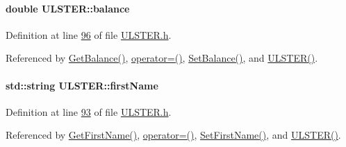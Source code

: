 \paragraph[{\texorpdfstring{balance}{balance}}]{\setlength{\rightskip}{0pt plus 5cm}double U\+L\+S\+T\+E\+R\+::balance\hspace{0.3cm}{\ttfamily [private]}}\hypertarget{class_u_l_s_t_e_r_af98d3ed41f452b28f26994552465815c_af98d3ed41f452b28f26994552465815c}{}\label{class_u_l_s_t_e_r_af98d3ed41f452b28f26994552465815c_af98d3ed41f452b28f26994552465815c}


Definition at line \hyperlink{_u_l_s_t_e_r_8h_source_l00096}{96} of file \hyperlink{_u_l_s_t_e_r_8h_source}{U\+L\+S\+T\+E\+R.\+h}.



Referenced by \hyperlink{_u_l_s_t_e_r_8cpp_source_l00070}{Get\+Balance()}, \hyperlink{_u_l_s_t_e_r_8h_source_l00062}{operator=()}, \hyperlink{_u_l_s_t_e_r_8cpp_source_l00066}{Set\+Balance()}, and \hyperlink{_u_l_s_t_e_r_8h_source_l00024}{U\+L\+S\+T\+E\+R()}.

\paragraph[{\texorpdfstring{first\+Name}{firstName}}]{\setlength{\rightskip}{0pt plus 5cm}std\+::string U\+L\+S\+T\+E\+R\+::first\+Name\hspace{0.3cm}{\ttfamily [private]}}\hypertarget{class_u_l_s_t_e_r_af8d138fdca14b59130b8b4ddd3d73b16_af8d138fdca14b59130b8b4ddd3d73b16}{}\label{class_u_l_s_t_e_r_af8d138fdca14b59130b8b4ddd3d73b16_af8d138fdca14b59130b8b4ddd3d73b16}


Definition at line \hyperlink{_u_l_s_t_e_r_8h_source_l00093}{93} of file \hyperlink{_u_l_s_t_e_r_8h_source}{U\+L\+S\+T\+E\+R.\+h}.



Referenced by \hyperlink{_u_l_s_t_e_r_8cpp_source_l00094}{Get\+First\+Name()}, \hyperlink{_u_l_s_t_e_r_8h_source_l00062}{operator=()}, \hyperlink{_u_l_s_t_e_r_8cpp_source_l00090}{Set\+First\+Name()}, and \hyperlink{_u_l_s_t_e_r_8h_source_l00024}{U\+L\+S\+T\+E\+R()}.

